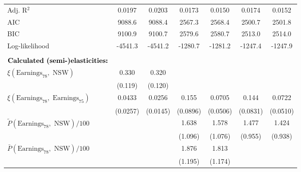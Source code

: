 {\begin{tabular}{l*{6}{c}}
Adj. R$^2$      &   0.0197         &   0.0203         &   0.0173         &   0.0150         &   0.0174         &   0.0152         \\
AIC             &   9088.6         &   9088.4         &   2567.3         &   2568.4         &   2500.7         &   2501.8         \\
BIC             &   9100.9         &   9100.7         &   2579.6         &   2580.7         &   2513.0         &   2514.0         \\
Log-likelihood  &  -4541.3         &  -4541.2         &  -1280.7         &  -1281.2         &  -1247.4         &  -1247.9         \\
\hline          &                  &                  &                  &                  &                  &                  \\
$\text{\textbf{Calculated (semi-)elasticities:}}$&                  &                  &                  &                  &                  &                  \\
$\xi(\text{Earnings}_{78},\text{ NSW})$&    0.330         &    0.320         &                  &                  &                  &                  \\
                &  (0.119)         &  (0.120)         &                  &                  &                  &                  \\
$\xi(\text{Earnings}_{78},\text{ Earnings}_{75})$&   0.0433         &   0.0256         &    0.155         &   0.0705         &    0.144         &   0.0722         \\
                & (0.0257)         & (0.0145)         & (0.0896)         & (0.0506)         & (0.0831)         & (0.0510)         \\
$\tilde{P}(\text{Earnings}_{78},\text{ NSW})/100$&                  &                  &    1.638         &    1.578         &    1.477         &    1.424         \\
                &                  &                  &  (1.096)         &  (1.076)         &  (0.955)         &  (0.938)         \\
$\bar{P}(\text{Earnings}_{78},\text{ NSW})/100$&                  &                  &    1.876         &    1.813         &                  &                  \\
                &                  &                  &  (1.195)         &  (1.174)         &                  &                  \\
\hline\hline
\end{tabular}
}
